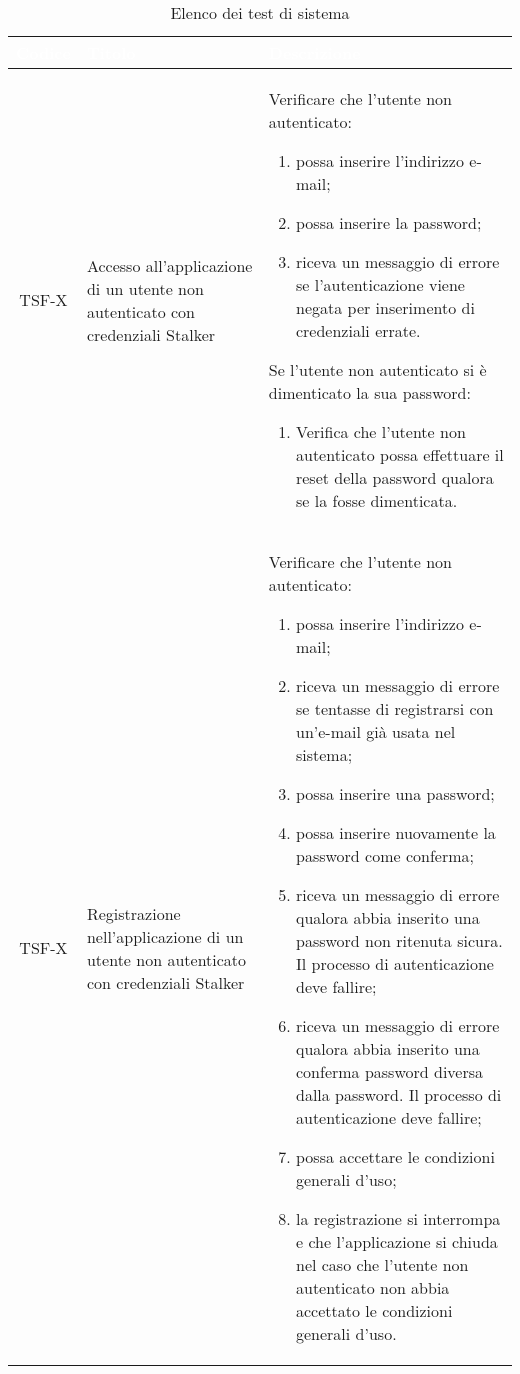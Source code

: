 {
\renewcommand{\arraystretch}{1.5}
\centering
\begin{longtable}{ c | C{3cm} | C{11cm} }
\caption{Elenco dei test di sistema}\\
\textcolor{white}{\textbf{Codice}} & \textcolor{white}{\textbf{Titolo}} & \textcolor{white}{\textbf{Descrizione}} \\
\hline
\endhead

TSF-X & Accesso all'applicazione di un utente non autenticato con credenziali Stalker &
Verificare che l'utente non autenticato:
\begin{enumerate}
    \item possa inserire l'indirizzo e-mail;
    \item possa inserire la password;
    \item riceva un messaggio di errore se l'autenticazione viene negata per inserimento di credenziali errate.
\end{enumerate}
Se l'utente non autenticato si è dimenticato la sua password:
\begin{enumerate}
    \item Verifica che l'utente non autenticato possa effettuare il reset della password qualora se la fosse dimenticata.
\end{enumerate} \\

TSF-X & Registrazione nell'applicazione di un utente non autenticato con credenziali Stalker &
Verificare che l'utente non autenticato:
\begin{enumerate}
    \item possa inserire l'indirizzo e-mail;
    \item riceva un messaggio di errore se tentasse di registrarsi con un'e-mail già usata nel sistema;
    \item possa inserire una password;
    \item possa inserire nuovamente la password come conferma;
    \item riceva un messaggio di errore qualora abbia inserito una password non ritenuta sicura. Il processo di autenticazione deve fallire;
    \item riceva un messaggio di errore qualora abbia inserito una conferma password diversa dalla password. Il processo di autenticazione deve fallire;
    \item possa accettare le condizioni generali d'uso;
    \item la registrazione si interrompa e che l'applicazione si chiuda nel caso che l'utente non autenticato non abbia accettato le condizioni generali d'uso.
\end{enumerate} \\


\end{longtable}}

